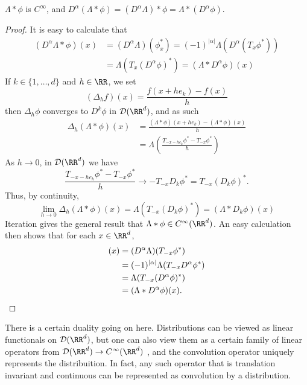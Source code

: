 \begin{theorem}
    $\Lambda * \phi$ is $C^\infty$, and $D^\alpha(\Lambda * \phi) = (D^\alpha \Lambda) * \phi = \Lambda * (D^\alpha \phi)$.
\end{theorem}
\begin{proof}
    It is easy to calculate that
    \begin{align*}
        (D^\alpha \Lambda * \phi)(x) &= (D^\alpha \Lambda)(\phi^*_x) = (-1)^{|\alpha|} \Lambda(D^\alpha (T_x \phi^*))\\
        &= \Lambda(T_x (D^\alpha \phi)^*) = (\Lambda * D^\alpha \phi)(x)
    \end{align*}
    If $k \in \{ 1, \dots, d \}$ and $h \in \RR$, we set
    \[ (\Delta_h f)(x) = \frac{f(x + he_k) - f(x)}{h} \]
    then $\Delta_h \phi$ converges to $D^k \phi$ in $\mathcal{D}(\RR^d)$, and as such
    \begin{align*}
      \Delta_h(\Lambda * \phi)(x) &= \frac{(\Lambda * \phi)(x + he_k) - (\Lambda * \phi)(x)}{ h}\\
      &= \Lambda \left( \frac{T_{-x - he_k} \phi^* - T_{-x} \phi^*}{h} \right)
    \end{align*}
    As $h \to 0$, in $\mathcal{D}(\RR^d)$ we have
    \[ \frac{T_{-x - he_k} \phi^* - T_{-x} \phi^*}{h} \to - T_{-x} D_k \phi^* = T_{-x} (D_k \phi)^*. \]
    Thus, by continuity,
    \[ \lim_{h \to 0} \Delta_h(\Lambda * \phi)(x) = \Lambda(T_{-x} (D_k \phi)^*) = (\Lambda * D_k \phi)(x) \]
    Iteration gives the general result that $\Lambda * \phi \in C^\infty(\RR^d)$. An easy calculation then shows that for each $x \in \RR^d$,
    \begin{align*}
      [(D^\alpha \Lambda) * \phi](x) &= (D^\alpha \Lambda)(T_{-x} \phi^*)\\
      &= (-1)^{|\alpha|} \Lambda(T_{-x} D^\alpha \phi^*)\\
      &= \Lambda(T_{-x} (D^\alpha \phi)^*)\\
      &= (\Lambda * D^\alpha \phi)(x). \qedhere
    \end{align*}
\end{proof}

There is a certain duality going on here. Distributions can be viewed as linear functionals on $\mathcal{D}(\RR^d)$, but one can also view them as a certain family of linear operators from $\mathcal{D}(\RR^d) \to C^\infty(\RR^d)$ , and the convolution operator uniquely represents the distribuition. In fact, any such operator that is translation invariant and continuous can be represented as convolution by a distribution.

